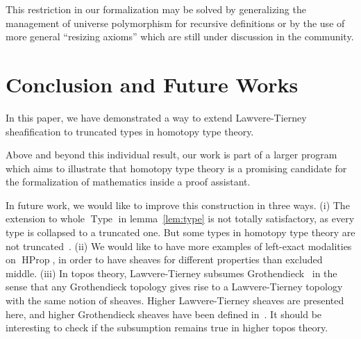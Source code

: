 \documentclass[notfinal]{jfrarticle}
\DeclareMathOperator{\Type}{Type}
\DeclareMathOperator{\HProp}{HProp}
\newcommand{\eg}{\emph{e.g.}}
\begin{document}
%
This restriction in our formalization may be solved by
generalizing the management of universe polymorphism for recursive definitions
%
or by the use of more general ``resizing axioms'' which are still under
discussion in the community.
 

\section{Conclusion and Future Works}
\label{sec:future-works}

In this paper, we have demonstrated a way to extend Lawvere-Tierney
sheafification to truncated types in homotopy type theory. 

%
Above and beyond this individual result, our work is part of a larger program
which aims to illustrate that homotopy type theory is a promising
candidate for the formalization of mathematics inside a proof assistant.


In future work, we would like to improve this construction in three
ways.
(i) The extension to whole $\Type$ in lemma~\ref{lem:type} is not
  totally satisfactory, as every type is collapsed to a truncated
  one. But some types in homotopy type theory are not
  truncated~\cite[Example 8.8.6]{hottbook}.
(ii) 
  We would like to have more examples of left-exact modalities on
  $\HProp$, in order to have sheaves for different properties than
  excluded middle.
%
(iii) In topos theory, Lawvere-Tierney subsumes Grothendieck~\cite[Section~V.4]{maclanemoerdijk} in the sense that any
Grothendieck topology gives rise to a Lawvere-Tierney topology with
the same notion of sheaves. Higher Lawvere-Tierney sheaves are
presented here, and higher Grothendieck sheaves have been defined
in~\cite{lurie}. It should be interesting to check if the subsumption
remains true in higher topos theory.
\end{document}
